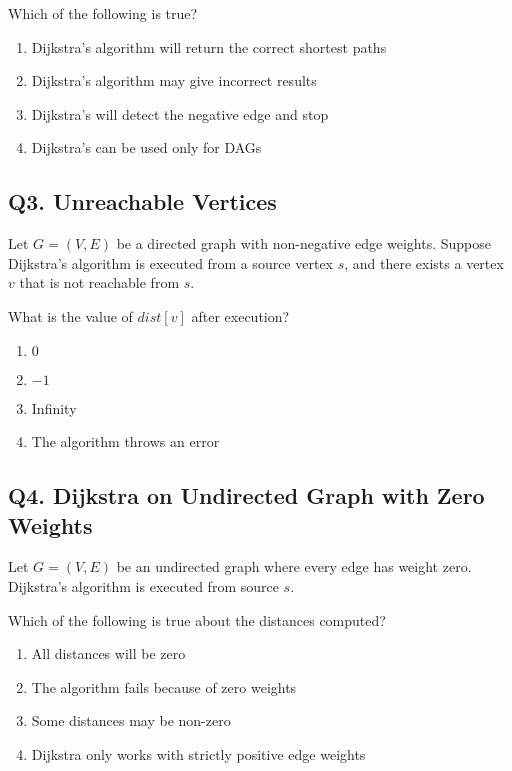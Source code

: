 Which of the following is true?

\begin{enumerate}[label=(\alph*)]
    \item Dijkstra's algorithm will return the correct shortest paths
    \item Dijkstra's algorithm may give incorrect results
    \item Dijkstra's will detect the negative edge and stop
    \item Dijkstra's can be used only for DAGs
\end{enumerate}

\subsection*{Q3. Unreachable Vertices}
Let $G = (V, E)$ be a directed graph with non-negative edge weights. Suppose Dijkstra's algorithm is executed from a source vertex $s$, and there exists a vertex $v$ that is not reachable from $s$.

What is the value of $dist[v]$ after execution?

\begin{enumerate}[label=(\alph*)]
    \item $0$
    \item $-1$
    \item Infinity
    \item The algorithm throws an error
\end{enumerate}

\subsection*{Q4. Dijkstra on Undirected Graph with Zero Weights}
Let $G = (V, E)$ be an undirected graph where every edge has weight zero. Dijkstra's algorithm is executed from source $s$.

Which of the following is true about the distances computed?

\begin{enumerate}[label=(\alph*)]
    \item All distances will be zero
    \item The algorithm fails because of zero weights
    \item Some distances may be non-zero
    \item Dijkstra only works with strictly positive edge weights
\end{enumerate}

